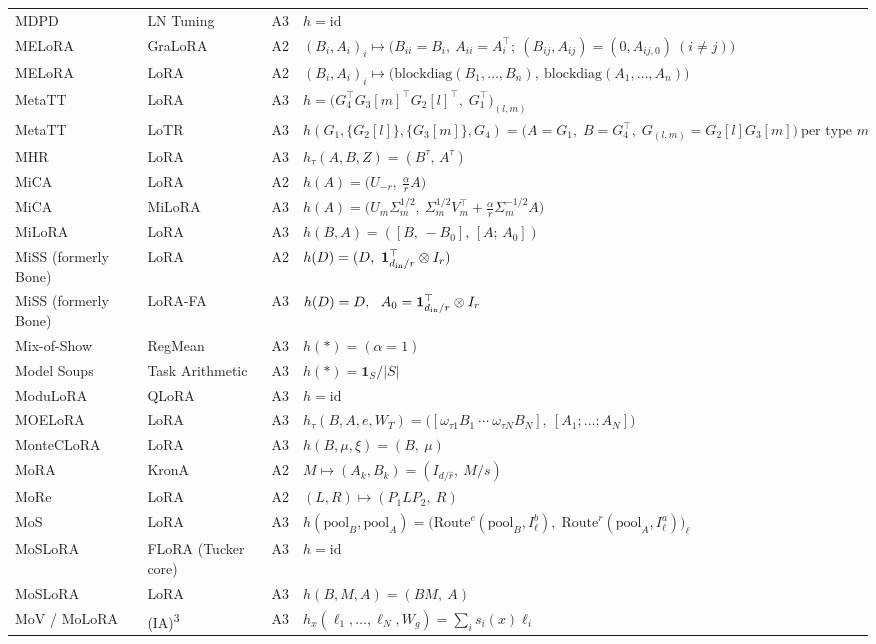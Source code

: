 \begin{longtable}{@{}>{\raggedright\arraybackslash}p{2.4cm}>{\raggedright\arraybackslash}p{2.4cm}c>{\raggedright\arraybackslash}p{8.6cm}@{}}
MDPD & LN Tuning & A3 & $h=\mathrm{id}$\\
MELoRA & GraLoRA & A2 & $(B_i,A_i)_i\mapsto\big(B_{ii}=B_i,\ A_{ii}=A_i^\top;\ (B_{ij},A_{ij})=(0,A_{ij,0})\ (i\neq j)\big)$\\
MELoRA & LoRA & A2 & $(B_i,A_i)_i\mapsto\big(\mathrm{blockdiag}(B_1,\dots,B_n),\ \mathrm{blockdiag}(A_1,\dots,A_n)\big)$\\
MetaTT & LoRA & A3 & $h=\big(G_4^\top G_3[m]^\top G_2[l]^\top,\;G_1^\top\big)_{(l,m)}$\\
MetaTT & LoTR & A3 & $h(G_1,\{G_2[l]\},\{G_3[m]\},G_4)=\big(A=G_1,\;B=G_4^\top,\;G_{(l,m)}=G_2[l]G_3[m]\big)\ \text{per type }m$\\
MHR & LoRA & A3 & $h_\tau(A,B,Z)=(B^\tau,\,A^\tau)$\\
MiCA & LoRA & A2 & $h(A)=\big(U_{-r},\ \tfrac{\alpha}{r}A\big)$\\
MiCA & MiLoRA & A3 & $h(A)=\big(U_m\Sigma_m^{1/2},\ \Sigma_m^{1/2}V_m^\top+\tfrac{\alpha}{r}\Sigma_m^{-1/2}A\big)$\\
MiLoRA & LoRA & A3 & $h(B,A)=([B,\,-B_0],\,[A;\,A_0])$\\
MiSS (formerly Bone) & LoRA & A2 & $h(D)=(D,\ \mathbf 1^\top_{d_{\rm in}/r}\otimes I_r)$\\
MiSS (formerly Bone) & LoRA-FA & A3 & $h(D)=D,\ \ A_0=\mathbf 1^\top_{d_{\rm in}/r}\otimes I_r$\\
Mix-of-Show & RegMean & A3 & $h(\ast)=(\alpha=1)$\\
Model Soups & Task Arithmetic & A3 & $h(\ast)=\mathbf 1_S/|S|$\\
ModuLoRA & QLoRA & A3 & $h=\mathrm{id}$\\
MOELoRA & LoRA & A3 & $h_\tau(B,A,e,W_T)=\big([\omega_{\tau1}B_1\ \cdots\ \omega_{\tau N}B_N],\ [A_1;\dots;A_N]\big)$\\
MonteCLoRA & LoRA & A3 & $h(B,\mu,\xi)=(B,\ \mu)$\\
MoRA & KronA & A2 & $M\mapsto(A_k,B_k)=(I_{d/\hat r},\ M/s)$\\
MoRe & LoRA & A2 & $(L,R)\mapsto(P_1LP_2,\ R)$\\
MoS & LoRA & A3 & $h(\mathrm{pool}_B,\mathrm{pool}_A)=\big(\mathrm{Route}^c(\mathrm{pool}_B,I^b_\ell),\;\mathrm{Route}^r(\mathrm{pool}_A,I^a_\ell)\big)_\ell$\\
MoSLoRA & FLoRA (Tucker core) & A3 & $h=\mathrm{id}$\\
MoSLoRA & LoRA & A3 & $h(B,M,A)=(BM,\ A)$\\
MoV / MoLoRA & (IA)\textsuperscript{3} & A3 & $h_x(\ell_1,\dots,\ell_N,W_g)=\textstyle\sum_is_i(x)\ell_i$\\

\end{longtable}
